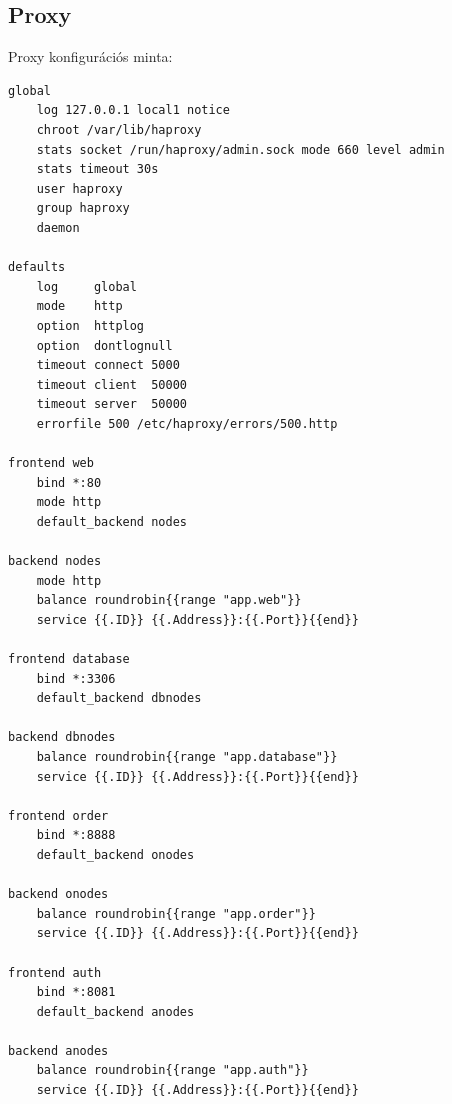 \documentclass[11pt,magyar,a4paper,twoside,]{report}
\begin{document}
\subsection{\texorpdfstring{Proxy\label{appendix-template}}{Proxy}}\label{proxy-1}

Proxy konfigurációs minta:

\begin{verbatim}
global
    log 127.0.0.1 local1 notice
    chroot /var/lib/haproxy
    stats socket /run/haproxy/admin.sock mode 660 level admin
    stats timeout 30s
    user haproxy
    group haproxy
    daemon

defaults
    log     global
    mode    http
    option  httplog
    option  dontlognull
    timeout connect 5000
    timeout client  50000
    timeout server  50000
    errorfile 500 /etc/haproxy/errors/500.http

frontend web
    bind *:80
    mode http
    default_backend nodes

backend nodes
    mode http
    balance roundrobin{{range "app.web"}}
    service {{.ID}} {{.Address}}:{{.Port}}{{end}}

frontend database
    bind *:3306
    default_backend dbnodes

backend dbnodes
    balance roundrobin{{range "app.database"}}
    service {{.ID}} {{.Address}}:{{.Port}}{{end}}

frontend order
    bind *:8888
    default_backend onodes

backend onodes
    balance roundrobin{{range "app.order"}}
    service {{.ID}} {{.Address}}:{{.Port}}{{end}}

frontend auth
    bind *:8081
    default_backend anodes

backend anodes
    balance roundrobin{{range "app.auth"}}
    service {{.ID}} {{.Address}}:{{.Port}}{{end}}
\end{verbatim}
\end{document}
